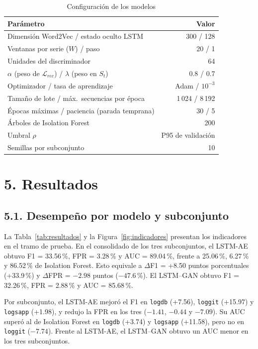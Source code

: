 \documentclass[jou,a4paper,floatsintext,donotrepeattitle]{apa7}
\begin{document}
\begin{table}[t]
\caption{Configuración de los modelos}
\label{tab:hiper}
\small
\begin{tabularx}{\columnwidth}{@{}Xr@{}}
\toprule
Parámetro & Valor \\
\midrule
Dimensión Word2Vec / estado oculto LSTM & 300 / 128 \\
Ventanas por serie ($W$) / paso & 20 / 1 \\
Unidades del discriminador & 64 \\
$\alpha$ (peso de $\mathcal{L}_{rec}$) / $\lambda$ (peso en $S_t$) & 0.8 / 0.7 \\
Optimizador / tasa de aprendizaje & Adam / $10^{-3}$ \\
Tamaño de lote / máx.\ secuencias por época & 1\,024 / 8\,192 \\
Épocas máximas / paciencia (parada temprana) & 30 / 5 \\
Árboles de Isolation Forest & 200 \\
Umbral $\rho$ & P95 de validación \\
Semillas por subconjunto & 10 \\
\bottomrule
\end{tabularx}
\end{table}

\section{5. Resultados}
\subsection{5.1. Desempeño por modelo y subconjunto}
La Tabla~\ref{tab:resultados} y la Figura~\ref{fig:indicadores} presentan los indicadores en el tramo de prueba. En el consolidado de los tres subconjuntos, el LSTM-AE obtuvo F1 = 33.56\,\%, FPR = 3.28\,\% y AUC = 89.04\,\%, frente a 25.06\,\%, 6.27\,\% y 86.52\,\% de Isolation Forest. Esto equivale a $\Delta$F1 = +8.50 puntos porcentuales (+33.9\,\%) y $\Delta$FPR = $-2.98$ puntos ($-47.6$\,\%). El LSTM--GAN obtuvo F1 = 32.26\,\%, FPR = 2.88\,\% y AUC = 85.68\,\%.

Por subconjunto, el LSTM-AE mejoró el F1 en \texttt{logdb} (+7.56), \texttt{loggit} (+15.97) y \texttt{logsapp} (+1.98), y redujo la FPR en los tres ($-1.41$, $-0.44$ y $-7.09$). Su AUC superó al de Isolation Forest en \texttt{logdb} (+3.74) y \texttt{logsapp} (+11.58), pero no en \texttt{loggit} ($-7.74$). Frente al LSTM-AE, el LSTM--GAN obtuvo un AUC menor en los tres subconjuntos.
\end{document}
